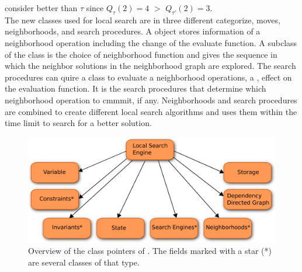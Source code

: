 consider better than $\tau$ since $Q_\tau(2) = 4$ $>$ $Q_{\tau'}(2) = 3$. \\
The new classes used for local search are in three different categorize, moves, neighborhoods, and search 
procedures. A  object stores information of a neighborhood operation including the change of the evaluate 
function. A subclass of the  class is the choice of neighborhood function and gives the 
sequence in which the neighbor solutions in the neighborhood graph are explored. The search procedures can quire a 
 class to evaluate a neighborhood operations, a , effect on the evaluation function. It 
is the search procedures that determine which neighborhood operation to cmmmit, if any. Neighborhoods and search 
procedures are combined to create different local search algorithms and  uses them within the 
time limit to search for a better solution. \\ 
\begin{figure}[!t]
\begin{center}
\includegraphics[width=0.9\linewidth]{LSE}\caption{Overview of the class pointers of . The 
fields 
marked with a star (*) are several classes of that type.} 
\label{fig_lse}
\end{center}
\end{figure}\noindent





